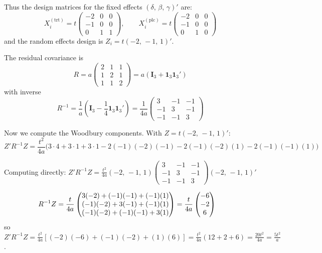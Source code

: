 \documentclass[
  11pt,
]{article}
\begin{document}
Thus the design matrices for the fixed effects
\((\delta,\, \beta,\, \gamma)'\) are: \[
  X_i^{(\text{trt})} = t\begin{pmatrix}
    -2 & 0 & 0 \\ -1 & 0 & 0 \\ 0 & 1 & 1
  \end{pmatrix}, \qquad
  X_i^{(\text{plc})} = t\begin{pmatrix}
    -2 & 0 & 0 \\ -1 & 0 & 0 \\ 0 & 1 & 0
  \end{pmatrix}
\] and the random effects design is \(Z_i = t(-2,\, -1,\, 1)'\).

The residual covariance is \begin{equation}
  R = a\begin{pmatrix}
    2 & 1 & 1 \\ 1 & 2 & 1 \\ 1 & 1 & 2
  \end{pmatrix}
  = a(\mathbf{I}_3 + \mathbf{1}_3\mathbf{1}_3')
\end{equation} with inverse \begin{equation}
  R^{-1} = \frac{1}{a}\left(\mathbf{I}_3
    - \frac{1}{4}\mathbf{1}_3\mathbf{1}_3'\right)
  = \frac{1}{4a}\begin{pmatrix}
    3 & -1 & -1 \\ -1 & 3 & -1 \\ -1 & -1 & 3
  \end{pmatrix}
\end{equation}

Now we compute the Woodbury components. With \(Z = t(-2,\, -1,\, 1)'\):
\begin{equation}
  Z'R^{-1}Z = \frac{t^2}{4a}\bigl(
    3 \cdot 4 + 3 \cdot 1 + 3 \cdot 1
    - 2(-1)(-2)(-1) - 2(-1)(-2)(1)
    - 2(-1)(-1)(1)\bigr)
\end{equation}

Computing directly: \(Z'R^{-1}Z = \frac{t^2}{4a}(-2,\,-1,\,1)
\begin{pmatrix} 3&-1&-1 \\ -1&3&-1 \\ -1&-1&3
\end{pmatrix}
(-2,\,-1,\,1)'\)

\begin{align}
  R^{-1}Z &= \frac{t}{4a}\begin{pmatrix}
    3(-2)+(-1)(-1)+(-1)(1) \\
    (-1)(-2)+3(-1)+(-1)(1) \\
    (-1)(-2)+(-1)(-1)+3(1)
  \end{pmatrix}
  = \frac{t}{4a}\begin{pmatrix}
    -6 \\ -2 \\ 6
  \end{pmatrix}
  \notag
\end{align} so \(Z'R^{-1}Z = \frac{t^2}{4a}
[(-2)(-6)+(-1)(-2)+(1)(6)] = \frac{t^2}{4a}(12+2+6)
= \frac{20t^2}{4a} = \frac{5t^2}{a}\).
\end{document}
